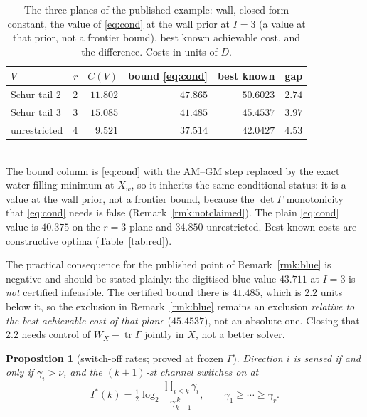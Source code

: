 \documentclass[journal]{IEEEtran}
\newtheorem{proposition}{Proposition}
\theoremstyle{remark}
\begin{document}
\begin{table}[h]
 \centering\caption{The three planes of the published example: wall, closed-form
 constant, the value of \eqref{eq:cond} at the wall prior at $I=3$ (a value at
 that prior, not a frontier bound), best known achievable cost, and the
 difference. Costs in units of $D$.}
 \label{tab:bound}
 \begin{tabularx}{\columnwidth}{Xrrrrr}
 \hline
 $V$ & $r$ & $C(V)$ & bound \eqref{eq:cond} & best known & gap \\
 \hline
 Schur tail $2$ & $2$ & $11.802$ & $47.865$ & $50.6023$ & $2.74$ \\
 Schur tail $3$ & $3$ & $15.085$ & $41.485$ & $45.4537$ & $3.97$ \\
 unrestricted & $4$ & $9.521$ & $37.514$ & $42.0427$ & $4.53$ \\
 \hline
 \end{tabularx}
 \\[1pt]{\scriptsize The bound column is \eqref{eq:cond} with the
 $\mathrm{AM}$--$\mathrm{GM}$ step replaced by the exact water-filling minimum
 at $X_w$, so it inherits the same conditional status: it is a value at the wall
 prior, not a frontier bound, because the $\det\Gamma$ monotonicity that
 \eqref{eq:cond} needs is false (Remark~\ref{rmk:notclaimed}). The plain
 \eqref{eq:cond} value is $40.375$ on the $r=3$ plane and $34.850$
 unrestricted. Best known costs are constructive optima
 (Table~\ref{tab:red}).}
\end{table}

The practical consequence for the published point of Remark~\ref{rmk:blue} is
negative and should be stated plainly: the digitised blue value $43.711$ at $I=3$
is \emph{not} certified infeasible. The certified bound there is $41.485$, which
is $2.2$ units below it, so the exclusion in Remark~\ref{rmk:blue} remains an
exclusion \emph{relative to the best achievable cost of that plane}
($45.4537$), not an absolute one. Closing that $2.2$ needs control of
$W_X-\operatorname{tr}\Gamma$ jointly in $X$, not a better solver.

\begin{proposition}[switch-off rates; proved at frozen $\Gamma$]
\label{pr:switch}
Direction $i$ is sensed if and only if $\gamma_i>\nu$, and the $(k{+}1)$-st
channel switches on at
\begin{equation}
 I^*(k)=\tfrac12\log_2\frac{\prod_{i\le k}\gamma_i}{\gamma_{k+1}^{\,k}},
 \qquad \gamma_1\ge\cdots\ge\gamma_r.
\label{eq:istar}
\end{equation}
\end{proposition}
\end{document}
